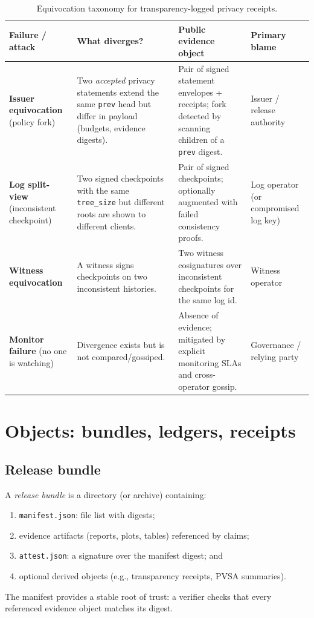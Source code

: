 \documentclass[11pt]{article}
\begin{document}
\begin{table}[t]
\centering
\small
\begin{tabular}{@{}L{2.8cm}L{3.3cm}L{4.2cm}L{2.2cm}@{}}
\toprule
\textbf{Failure / attack} & \textbf{What diverges?} & \textbf{Public evidence object} & \textbf{Primary blame} \\
\midrule
\textbf{Issuer equivocation} (policy fork) & Two \emph{accepted} privacy statements extend the same \texttt{prev} head but differ in payload (budgets, evidence digests). & Pair of signed statement envelopes + receipts; fork detected by scanning children of a \texttt{prev} digest. & Issuer / release authority \\
\addlinespace
\textbf{Log split-view} (inconsistent checkpoint) & Two signed checkpoints with the same \texttt{tree\_size} but different roots are shown to different clients. & Pair of signed checkpoints; optionally augmented with failed consistency proofs. & Log operator (or compromised log key) \\
\addlinespace
\textbf{Witness equivocation} & A witness signs checkpoints on two inconsistent histories. & Two witness cosignatures over inconsistent checkpoints for the same log id. & Witness operator \\
\addlinespace
\textbf{Monitor failure} (no one is watching) & Divergence exists but is not compared/gossiped. & Absence of evidence; mitigated by explicit monitoring SLAs and cross-operator gossip. & Governance / relying party \\
\bottomrule
\end{tabular}
\caption{Equivocation taxonomy for transparency-logged privacy receipts.}
\label{tab:equivocation-taxonomy}
\end{table}

\section{Objects: bundles, ledgers, receipts}
\subsection{Release bundle}
A \emph{release bundle} is a directory (or archive) containing:
\begin{enumerate}[leftmargin=1.4em]
\item \texttt{manifest.json}: file list with digests;
\item evidence artifacts (reports, plots, tables) referenced by claims;
\item \texttt{attest.json}: a signature over the manifest digest; and
\item optional derived objects (e.g., transparency receipts, PVSA summaries).
\end{enumerate}
The manifest provides a stable root of trust: a verifier checks that every referenced evidence object matches its digest.
\end{document}
